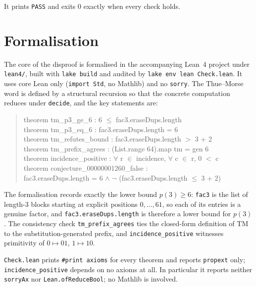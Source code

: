 \documentclass[11pt]{article}
\theoremstyle{definition}
\theoremstyle{remark}
\newcommand{\TM}{\mathrm{TM}}
\newcommand{\code}[1]{\texttt{#1}}
\begin{document}
It prints \code{PASS} and exits $0$ exactly when every check holds.

\section{Formalisation}

The core of the disproof is formalised in the accompanying Lean~4 project
under \code{lean4/}, built with \code{lake build} and audited by
\code{lake env lean Check.lean}. It uses core Lean only (\code{import Std}, no
Mathlib) and no \code{sorry}. The Thue--Morse word is defined by a structural
recursion so that the concrete computation reduces under \code{decide}, and
the key statements are:

\begin{quote}\ttfamily
theorem tm\_p3\_ge\_6 : 6 \(\le\) fac3.eraseDups.length\\
theorem tm\_p3\_eq\_6 : fac3.eraseDups.length = 6\\
theorem tm\_refutes\_bound : fac3.eraseDups.length \(>\) 3 + 2\\
theorem tm\_prefix\_agrees : (List.range 64).map tm = gen 6\\
theorem incidence\_positive : \(\forall\) r \(\in\) incidence, \(\forall\) c \(\in\) r, 0 \(<\) c\\
theorem conjecture\_00000001260\_false :\\
\hspace*{2em}fac3.eraseDups.length = 6 \(\wedge\) \(\neg\) (fac3.eraseDups.length \(\le\) 3 + 2)
\end{quote}

\noindent The formalisation records exactly the lower bound $p(3) \ge 6$:
\code{fac3} is the list of length-$3$ blocks starting at explicit positions
$0,\dots,61$, so each of its entries is a genuine factor, and
\code{fac3.eraseDups.length} is therefore a lower bound for $p(3)$. The
consistency check \code{tm\_prefix\_agrees} ties the closed-form definition of
$\TM$ to the substitution-generated prefix, and \code{incidence\_positive}
witnesses primitivity of $0 \mapsto 01$, $1 \mapsto 10$.

\begin{sloppypar}
\code{Check.lean} prints \code{\#print axioms} for every theorem and reports
\code{propext} only; \code{incidence\_positive} depends on no axioms at all.
In particular it reports neither \code{sorryAx} nor
\code{Lean.ofReduceBool}; no Mathlib is involved.
\end{sloppypar}
\end{document}
